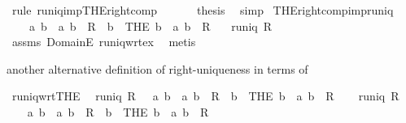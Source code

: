 \begin{isabellebody}
\ {\isacharparenleft}rule\ runiq{\isacharunderscore}imp{\isacharunderscore}THE{\isacharunderscore}right{\isacharunderscore}comp{\isacharparenright}\isanewline
\ \ \isamarkupfalse%
\ {\isacharasterisk}\ \isamarkupfalse%
\ {\isacharquery}thesis\ \isamarkupfalse%
\ simp\isanewline
{}\isamarkupfalse%
%
\endisatagproof
{\isafoldproof}%
%
\isadelimproof
\isanewline
%
\endisadelimproof
\isanewline
{}\isamarkupfalse%
\ THE{\isacharunderscore}right{\isacharunderscore}comp{\isacharunderscore}imp{\isacharunderscore}runiq{\isacharcolon}\isanewline
\ \ \ {\isachardoublequoteopen}{\isasymforall}\ a\ b\ {\isachardot}\ {\isacharparenleft}a{\isacharcomma}\ b{\isacharparenright}\ {\isasymin}\ R\ {\isasymlongrightarrow}\ b\ {\isacharequal}\ {\isacharparenleft}THE\ b\ {\isachardot}\ {\isacharparenleft}a{\isacharcomma}\ b{\isacharparenright}\ {\isasymin}\ R{\isacharparenright}{\isachardoublequoteclose}\isanewline
\ \ \ {\isachardoublequoteopen}runiq\ R{\isachardoublequoteclose}\isanewline
%
\isadelimproof
%
\endisadelimproof
%
\isatagproof
{}\isamarkupfalse%
\ assms\ DomainE\ runiq{\isacharunderscore}wrt{\isacharunderscore}ex{}\ \isamarkupfalse%
\ metis%
\endisatagproof
{\isafoldproof}%
%
\isadelimproof
%
\endisadelimproof
%
\begin{isamarkuptext}%
another alternative definition of right-uniqueness in terms of %
\end{isamarkuptext}%
\isamarkuptrue%
\isamarkupfalse%
\ runiq{\isacharunderscore}wrt{\isacharunderscore}THE{\isacharcolon}\isanewline
\ \ {\isachardoublequoteopen}runiq\ R\ {\isasymlongleftrightarrow}\ {\isacharparenleft}{\isasymforall}\ a\ b\ {\isachardot}\ {\isacharparenleft}a{\isacharcomma}\ b{\isacharparenright}\ {\isasymin}\ R\ {\isasymlongrightarrow}\ b\ {\isacharequal}\ {\isacharparenleft}THE\ b\ {\isachardot}\ {\isacharparenleft}a{\isacharcomma}\ b{\isacharparenright}\ {\isasymin}\ R{\isacharparenright}{\isacharparenright}{\isachardoublequoteclose}\isanewline
%
\isadelimproof
%
\endisadelimproof
%
\isatagproof
{}\isamarkupfalse%
\isanewline
\ \ \isamarkupfalse%
\ {\isachardoublequoteopen}runiq\ R{\isachardoublequoteclose}\isanewline
\ \ \isamarkupfalse%
\ \isamarkupfalse%
\ {\isachardoublequoteopen}{\isasymforall}\ a\ b\ {\isachardot}\ {\isacharparenleft}a{\isacharcomma}\ b{\isacharparenright}\ {\isasymin}\ R\ {\isasymlongrightarrow}\ b\ {\isacharequal}\ {\isacharparenleft}THE\ b\ {\isachardot}\ {\isacharparenleft}a{\isacharcomma}\ b{\isacharparenright}\ {\isasymin}\ R{\isacharparenright}{\isachardoublequoteclose}\ \isamarkupfalse%

\end{isabellebody}
